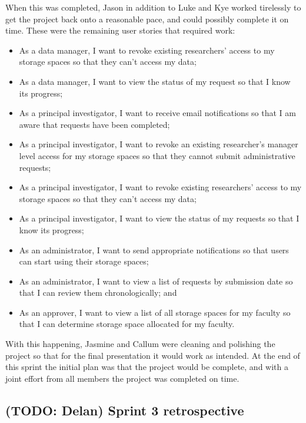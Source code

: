 \documentclass[a4paper,titlepage,12pt]{article}
\begin{document}
When this was completed, Jason in addition to Luke and Kye worked tirelessly to
get the project back onto a reasonable pace, and could possibly complete it on
time. These were the remaining user stories that required work:

\begin{itemize}
	\item As a data manager, I want to revoke existing researchers' access
	      to my storage spaces so that they can't access my data;
	\item As a data manager, I want to view the status of my request so
	      that I know its progress;
	\item As a principal investigator, I want to receive email
	      notifications so that I am aware that requests have been
	      completed;
	\item As a principal investigator, I want to revoke an existing
	      researcher's manager level access for my storage spaces so that
	      they cannot submit administrative requests;
	\item As a principal investigator, I want to revoke existing
	      researchers' access to my storage spaces so that they can't
	      access my data;
	\item As a principal investigator, I want to view the status of my
	      requests so that I know its progress;
	\item As an administrator, I want to send appropriate notifications so
	      that users can start using their storage spaces;
	\item As an administrator, I want to view a list of requests by
	      submission date so that I can review them chronologically; and
	\item As an approver, I want to view a list of all storage spaces for
	      my faculty so that I can determine storage space allocated for
	      my faculty.
\end{itemize}

With this happening, Jasmine and Callum were cleaning and polishing the project
so that for the final presentation it would work as intended. At the end of
this sprint the initial plan was that the project would be complete, and with
a joint effort from all members the project was completed on time.

\subsection{(TODO: Delan) Sprint 3 retrospective}
\end{document}
